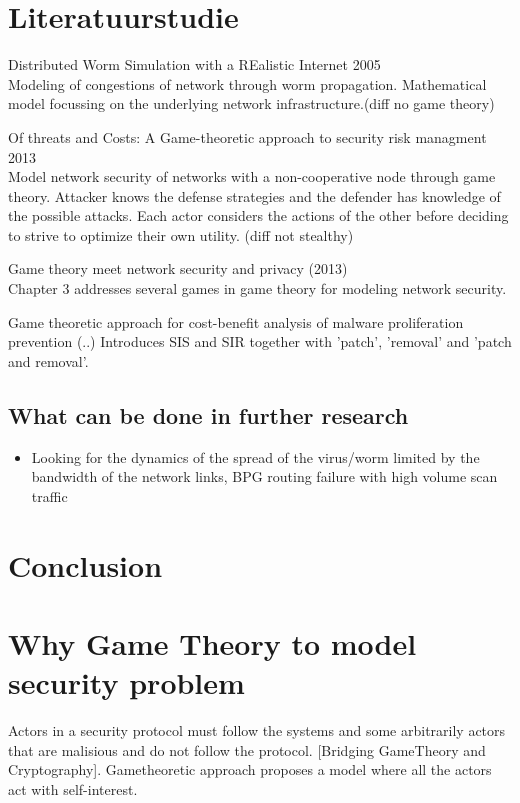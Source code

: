 \documentclass[10pt]{article}
\begin{document}
\section{Literatuurstudie}
\begin{description}
\item Distributed Worm Simulation with a REalistic Internet 2005  \\
Modeling of congestions of network through worm propagation. Mathematical model focussing on the underlying network infrastructure.(diff no game theory) 
\item Of threats and Costs: A Game-theoretic approach to security risk managment 2013\\
Model network security of networks with a non-cooperative node through game theory. Attacker knows the defense strategies and the defender has knowledge of the possible attacks. Each actor considers the actions of the other before deciding to strive to optimize their own utility. (diff not stealthy)
\item Game theory meet network security and privacy (2013) \\
Chapter 3 addresses several games in game theory for modeling network security.
\item Game theoretic approach for cost-benefit analysis of malware proliferation prevention (..)
Introduces SIS and SIR together with 'patch', 'removal' and 'patch and removal'.
\end{description}

\subsection{What can be done in further research}
\begin{itemize}
\item Looking for the dynamics of the spread of the virus/worm limited by the bandwidth of the network links, BPG routing failure with high volume scan traffic
\end{itemize}
\section{Conclusion}

\section{Why Game Theory to model security problem}
Actors in a security protocol must follow the systems and some arbitrarily actors that are malisious and do not follow the protocol. [Bridging GameTheory and Cryptography]. Gametheoretic approach proposes a model where all the actors act with self-interest. 
\end{document}
